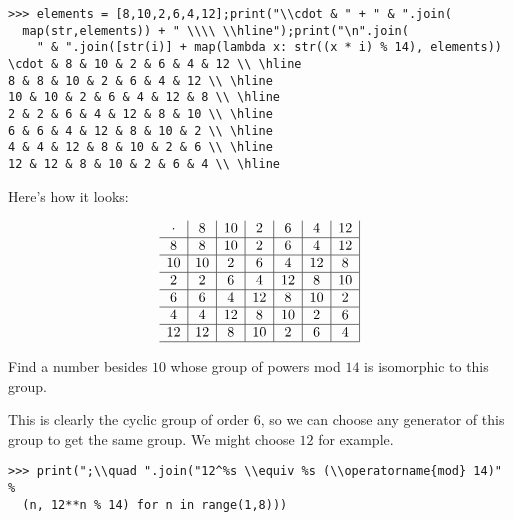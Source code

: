 \documentclass[../key.tex]{subfiles}
\begin{document}
\begin{verbatim}
>>> elements = [8,10,2,6,4,12];print("\\cdot & " + " & ".join(
  map(str,elements)) + " \\\\ \\hline");print("\n".join(
    " & ".join([str(i)] + map(lambda x: str((x * i) % 14), elements))
\cdot & 8 & 10 & 2 & 6 & 4 & 12 \\ \hline
8 & 8 & 10 & 2 & 6 & 4 & 12 \\ \hline
10 & 10 & 2 & 6 & 4 & 12 & 8 \\ \hline
2 & 2 & 6 & 4 & 12 & 8 & 10 \\ \hline
6 & 6 & 4 & 12 & 8 & 10 & 2 \\ \hline
4 & 4 & 12 & 8 & 10 & 2 & 6 \\ \hline
12 & 12 & 8 & 10 & 2 & 6 & 4 \\ \hline
\end{verbatim}

Here's how it looks:

$$\begin{array}{c|c|c|c|c|c|c|}
\cdot & 8 & 10 & 2 & 6 & 4 & 12 \\ \hline
8 & 8 & 10 & 2 & 6 & 4 & 12 \\ \hline
10 & 10 & 2 & 6 & 4 & 12 & 8 \\ \hline
2 & 2 & 6 & 4 & 12 & 8 & 10 \\ \hline
6 & 6 & 4 & 12 & 8 & 10 & 2 \\ \hline
4 & 4 & 12 & 8 & 10 & 2 & 6 \\ \hline
12 & 12 & 8 & 10 & 2 & 6 & 4 \\ \hline
\end{array}$$

\begin{inner_problem}
\item Find a number besides $10$ whose group of powers mod $14$ is isomorphic to this group.
\end{inner_problem}

This is clearly the cyclic group of order $6$, so we can choose any generator of this group to get the same group. We might choose $12$ for example.

\begin{verbatim}
>>> print(";\\quad ".join("12^%s \\equiv %s (\\operatorname{mod} 14)" %
  (n, 12**n % 14) for n in range(1,8)))
\end{verbatim}
\end{document}

